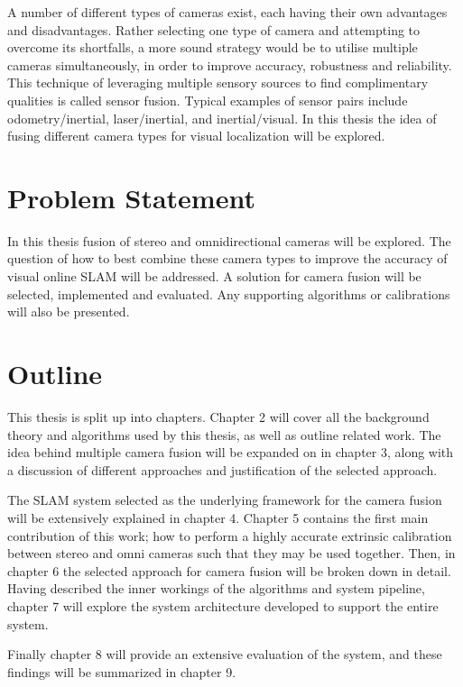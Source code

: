 A number of different types of cameras exist, each having their own advantages and disadvantages.  Rather selecting one type of camera and attempting to overcome its shortfalls, a more sound strategy would be to utilise multiple cameras simultaneously, in order to improve accuracy, robustness and reliability.  This technique of leveraging multiple sensory sources to find complimentary qualities is called sensor fusion.  Typical examples of sensor pairs include odometry/inertial, laser/inertial, and inertial/visual.  In this thesis the idea of fusing different camera types for visual localization will be explored.

\section{Problem Statement}

In this thesis fusion of stereo and omnidirectional cameras will be explored.  The question of how to best combine these camera types to improve the accuracy of visual online SLAM will be addressed.  A solution for camera fusion will be selected, implemented and evaluated.  Any supporting algorithms or calibrations will also be presented.

\section{Outline}

This thesis is split up into chapters.  Chapter 2 will cover all the background theory and  algorithms used by this thesis, as well as outline related work.  The idea behind multiple camera fusion will be expanded on in chapter 3, along with a discussion of different approaches and justification of the selected approach. 

The SLAM system selected as the underlying framework for the camera fusion will be extensively explained in chapter 4.  Chapter 5 contains the first main contribution of this work; how to perform a highly accurate extrinsic calibration between stereo and omni cameras such that they may be used together.  Then, in chapter 6 the selected approach for camera fusion will be broken down in detail.  Having described the inner workings of the algorithms and system pipeline, chapter 7 will explore the system architecture developed to support the entire system.

Finally chapter 8 will provide an extensive evaluation of the system, and these findings will be summarized in chapter 9.